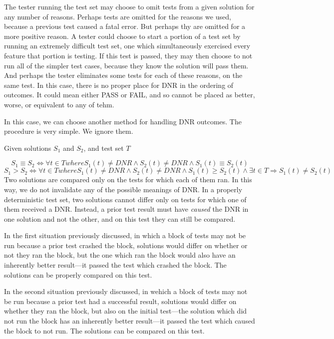 \documentclass[11pt]{article}
\begin{document}
The tester running the test set may choose to omit tests from a given solution for any number of reasons. Perhaps tests are omitted for the reasons we used, because a previous test caused a fatal error. But perhaps thy are omitted for a more positive reason. A tester could choose to start a portion of a test set by running an extremely difficult test set, one which simultaneously exercised every feature that portion is testing. If this test is passed, they may then choose to not run all of the simpler test cases, because they know the solution will pass them. And perhaps the tester eliminates some tests for each of these reasons, on the same test. In this case, there is no proper place for DNR in the ordering of outcomes. It could mean either PASS or FAIL, and so cannot be placed as better, worse, or equivalent to any of tehm.

In this case, we can choose another method for handling DNR outcomes. The procedure is very simple. We ignore them.

\centerline{Given solutions $S_1$ and $S_2$, and test set $T$}
$$S_1 \equiv S_2 \iff \forall t \in T where S_1(t) \neq DNR \wedge S_2(t) \neq DNR \wedge S_1(t) \equiv S_2(t)$$
$$S_1 > S_2 \iff \forall t \in T where S_1(t) \neq DNR \wedge S_2(t) \neq DNR \wedge S_1(t) \geq S_2(t) \wedge \exists t \in T \Rightarrow S_1(t) \neq S_2(t)$$
Two solutions are compared only on the tests for which each of them ran. In this way, we do not invalidate any of the possible meanings of DNR. In a properly deterministic test set, two solutions cannot differ only on tests for which one of them received a DNR. Instead, a prior test result must have \emph{caused} the DNR in one solution and not the other, and on this test they can still be compared. 

In the first situation previously discussed, in which a block of tests may not be run because a prior test crashed the block, solutions would differ on whether or not they ran the block, but the one which ran the block would also have an inherently better result---it passed the test which crashed the block. The solutions can be properly compared on this test.

In the second situation previously discussed, in wehich a block of tests may not be run because a prior test had a successful result, solutions would differ on whether they ran the block, but also on the initial test---the solution which did not run the block has an inherently better result---it passed the test which caused the block to not run. The solutions can be compared on this test.
\end{document}
